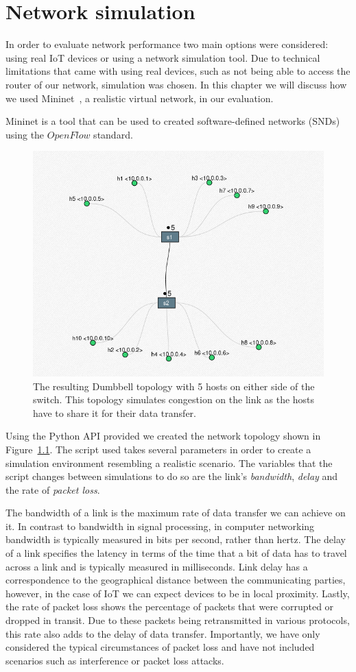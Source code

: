 \chapter{Network simulation}

In order to evaluate network performance two main options were considered: using real IoT devices or using a network simulation tool.
Due to technical limitations that came with using real devices, such as not being able to access the router of our network, simulation was chosen.
In this chapter we will discuss how we used Mininet~\citep{lantz_mininet_2021}, a realistic virtual network, in our evaluation.

Mininet is a tool that can be used to created software-defined networks (SNDs) using the $OpenFlow$ standard.

\begin{figure}[ht]
    \centering
    \includegraphics[width=0.5\linewidth]{images/mininet_topo.png}
    \caption{The resulting Dumbbell topology with 5 hosts on either side of the switch. This topology simulates congestion on the link as the hosts have to share it for their data transfer.}
    \label{fig:mininet-topo}
\end{figure}

Using the Python API provided we created the network topology shown in Figure~\ref{fig:mininet-topo}.
The script used takes several parameters in order to create a simulation environment resembling a realistic scenario.
The variables that the script changes between simulations to do so are the link's \textit{bandwidth}, \textit{delay} and the rate of \textit{packet loss}.

The bandwidth of a link is the maximum rate of data transfer we can achieve on it.
In contrast to bandwidth in signal processing, in computer networking bandwidth is typically measured in bits per second, rather than hertz.
The delay of a link specifies the latency in terms of the time that a bit of data has to travel across a link and is typically measured in milliseconds.
Link delay has a correspondence to the geographical distance between the communicating parties, however, in the case of IoT we can expect devices to be in local proximity.
Lastly, the rate of packet loss shows the percentage of packets that were corrupted or dropped in transit.
Due to these packets being retransmitted in various protocols, this rate also adds to the delay of data transfer.
Importantly, we have only considered the typical circumstances of packet loss and have not included scenarios such as interference or packet loss attacks.

